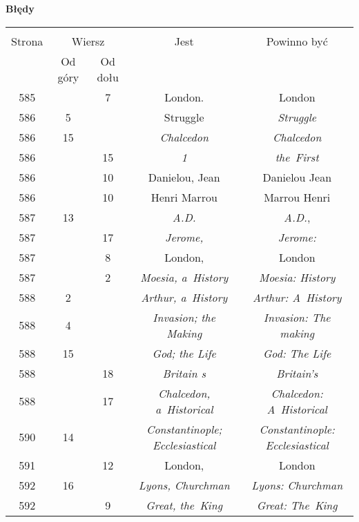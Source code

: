 \documentclass[a4paper,11pt]{article}  %
\newcommand{\tb}{\textbf}
\newcommand{\Center}[1]{\begin{center} #1 \end{center}}
\newcommand{\CenterTB}[1]{\Center{\tb{#1}}}
\begin{document}
\CenterTB{Błędy}
\begin{center}
  \begin{tabular}{|c|c|c|c|c|}
    \hline
    & \multicolumn{2}{c|}{} & & \\
    Strona & \multicolumn{2}{c|}{Wiersz}& Jest & Powinno być \\ \cline{2-3}
    & Od góry & Od dołu &  &  \\ \hline
    585 & &  7 & London. & London \\
    586 &  5 & & Struggle & \emph{Struggle} \\
    586 & 15 & & \emph{Chalcedon} & \emph{Chalcedon} \\
    586 & & 15 & \emph{1} & \emph{the~First} \\
    586 & & 10 & Danielou, Jean & Danielou Jean \\
    586 & & 10 & Henri Marrou & Marrou Henri \\
    587 & 13 & & \emph{A.D.} & \emph{A.D.}, \\
    587 & & 17 & \emph{Jerome,} & \emph{Jerome:} \\
    587 & &  8 & London, & London \\
    587 & &  2 & \emph{Moesia, a~History} & \emph{Moesia: History} \\
    588 &  2 & & \emph{Arthur, a~History} & \emph{Arthur: A~History} \\
    588 &  4 & & \emph{Invasion; the Making}
           & \emph{Invasion: The making} \\
    588 & 15 & & \emph{God; the Life} & \emph{God: The Life} \\
    588 & & 18 & \emph{Britain s} & \emph{Britain's} \\
    588 & & 17 & \emph{Chalcedon, a~Historical}
           & \emph{Chalcedon: A~Historical} \\
    590 & 14 & & \emph{Constantinople; Ecclesiastical}
           & \emph{Constantinople: Ecclesiastical} \\
    591 & & 12 & London, & London \\
    592 & 16 & & \emph{Lyons, Churchman} & \emph{Lyons: Churchman} \\
    592 & &  9 & \emph{Great, the~King} & \emph{Great: The~King} \\

\end{tabular}
\end{center}
\end{document}
